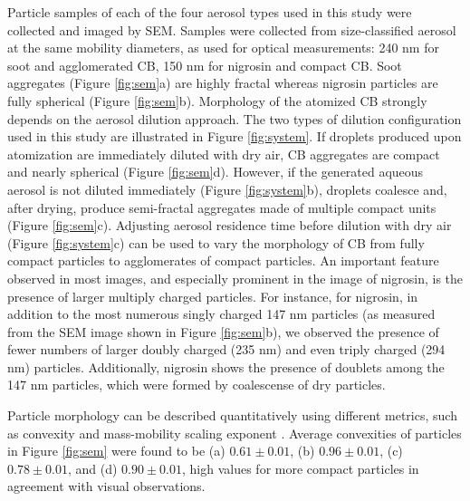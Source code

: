 Particle samples of each of the four aerosol types used in this study were collected and imaged by SEM. Samples were collected from size-classified aerosol at the same mobility diameters, as used for optical measurements: 240 nm for soot and agglomerated CB, 150 nm for nigrosin and compact CB. Soot aggregates (Figure \ref{fig:sem}a) are highly fractal whereas nigrosin particles are fully spherical (Figure \ref{fig:sem}b). Morphology of the atomized CB strongly depends on the aerosol dilution approach. The two types of dilution configuration used in this study are illustrated in Figure \ref{fig:system}. If droplets produced upon atomization are immediately diluted with dry air, CB aggregates are compact and nearly spherical (Figure \ref{fig:sem}d). However, if the generated aqueous aerosol is not diluted immediately (Figure \ref{fig:system}b), droplets coalesce and, after drying, produce semi-fractal aggregates made of multiple compact units (Figure \ref{fig:sem}c). Adjusting aerosol residence time before dilution with dry air (Figure \ref{fig:system}c) can be used to vary the morphology of CB from fully compact particles to agglomerates of compact particles. An important feature observed in most images, and especially prominent in the image of nigrosin, is the presence of larger multiply charged particles. For instance, for nigrosin, in addition to the most numerous singly charged 147 nm particles (as measured from the SEM image shown in Figure \ref{fig:sem}b), we observed the presence of fewer numbers of larger doubly charged (235 nm) and even triply charged (294 nm) particles. Additionally, nigrosin shows the presence of doublets among the 147 nm particles, which were formed by coalescense of dry particles. 

Particle morphology can be described quantitatively using different metrics, such as convexity and mass-mobility scaling exponent \citep{RN69}. Average convexities of particles in Figure \ref{fig:sem} were found to be (a) $0.61\pm 0.01$, (b) $0.96\pm 0.01$, (c) $0.78\pm 0.01$, and (d) $0.90\pm 0.01$, high values for more compact particles in agreement with visual observations.

